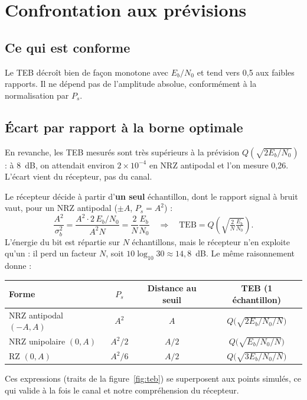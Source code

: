 \documentclass[11pt,a4paper]{article}
\newcommand{\EbNo}{E_b/N_0}
\begin{document}
\section{Confrontation aux prévisions}\label{sec:analyse}
\subsection{Ce qui est conforme}
Le TEB décroît bien de façon monotone avec $\EbNo$ et tend vers 0,5 aux faibles rapports. Il ne dépend pas de l'amplitude absolue, conformément à la normalisation par $P_s$.

\subsection{Écart par rapport à la borne optimale}
En revanche, les TEB mesurés sont très supérieurs à la prévision $Q(\sqrt{2\EbNo})$ : à 8~dB, on attendait environ $2\times10^{-4}$ en NRZ antipodal et l'on mesure 0,26. L'écart vient du récepteur, pas du canal.

Le récepteur décide à partir d'\textbf{un seul} échantillon, dont le rapport signal à bruit vaut, pour un NRZ antipodal ($\pm A$, $P_s = A^2$) :
\[ \frac{A^2}{\sigma_b^2} = \frac{A^2\cdot 2\,\EbNo}{A^2 N} = \frac{2}{N}\frac{E_b}{N_0}
\quad\Longrightarrow\quad \text{TEB} = Q\!\left(\sqrt{\tfrac{2}{N}\tfrac{E_b}{N_0}}\right). \]
L'énergie du bit est répartie sur $N$ échantillons, mais le récepteur n'en exploite qu'un : il perd un facteur $N$, soit $10\log_{10}30\approx 14{,}8$~dB. Le même raisonnement donne :
\begin{center}\begin{tabular}{lccc}\toprule
Forme & $P_s$ & Distance au seuil & TEB (1 échantillon)\\\midrule
NRZ antipodal $(-A, A)$ & $A^2$ & $A$ & $Q\big(\sqrt{2\EbNo/N}\big)$\\
NRZ unipolaire $(0, A)$ & $A^2/2$ & $A/2$ & $Q\big(\sqrt{\EbNo/N}\big)$\\
RZ $(0, A)$ & $A^2/6$ & $A/2$ & $Q\big(\sqrt{3\EbNo/N}\big)$\\\bottomrule\end{tabular}\end{center}
Ces expressions (traits de la figure~\ref{fig:teb}) se superposent aux points simulés, ce qui valide à la fois le canal et notre compréhension du récepteur.
\end{document}
